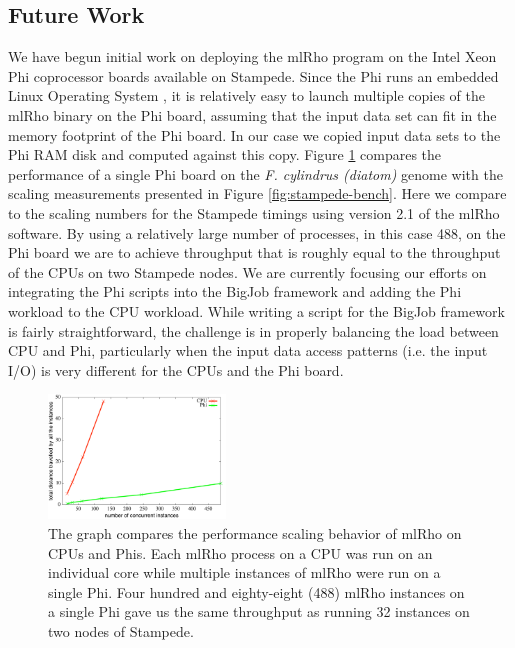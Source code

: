 \documentclass{sig-alternate}
\begin{document}
\subsection{Future Work}
We have begun initial work on deploying the mlRho program on the Intel Xeon Phi coprocessor boards
available on Stampede. Since the Phi runs an embedded Linux Operating System \cite{xeon_phi}, 
it is relatively easy to launch multiple copies of the mlRho binary on the Phi board, assuming
that the input data set can fit in the memory footprint of the Phi board. In our case we copied input data
sets to the Phi RAM disk and computed against this copy. Figure \ref{fig:mic-scaling} compares the performance
of a single Phi board on the {\it F. cylindrus (diatom)} genome with the scaling measurements presented in Figure
\ref{fig:stampede-bench}. Here we compare to the scaling numbers for the Stampede timings using version 2.1 of
the mlRho software. By using a relatively large number of processes, in this case 488, on the Phi board
we are to achieve throughput that is roughly equal to the throughput of the CPUs on two Stampede
nodes. We are currently focusing our efforts on integrating the Phi scripts into the BigJob framework and
adding the Phi workload to the CPU workload. While writing a script for the BigJob framework is fairly
straightforward, the challenge is in properly balancing the load between CPU and Phi, particularly when the
input data access patterns (i.e. the input I/O) is very different for the CPUs and the Phi board.
\begin{figure} %
\centering
\includegraphics[width=0.42\textwidth]{figures/mic-scaling.pdf}
\caption{The graph compares the performance scaling behavior of mlRho on CPUs and Phis. Each mlRho process on a CPU was run on an individual core while multiple instances of mlRho were run on a single Phi. Four hundred and eighty-eight (488) mlRho instances on a single Phi gave us the same throughput as running 32 instances on two nodes of Stampede.  }
\label{fig:mic-scaling}
\end{figure}
\end{document}
